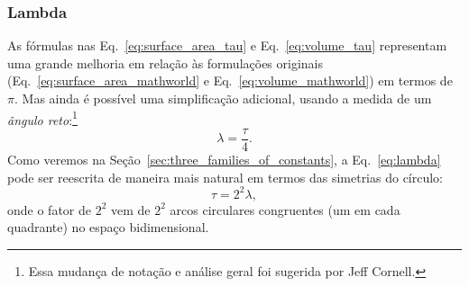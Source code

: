 {\subsubsection{Lambda} %
\label{sec:lambda}

As fórmulas nas Eq.~\eqref{eq:surface_area_tau} e Eq.~\eqref{eq:volume_tau} representam uma grande melhoria em relação às formulações originais (Eq.~\eqref{eq:surface_area_mathworld} e Eq.~\eqref{eq:volume_mathworld}) em termos de $\pi$. Mas ainda é possível uma simplificação adicional, usando a medida de um \emph{ângulo reto}:\footnote{Essa mudança de notação e análise geral foi sugerida por Jeff Cornell.}
\begin{equation}
\label{eq:lambda}
\lambda = \frac{\tau}{4}.
\end{equation}
Como veremos na Seção~\ref{sec:three_families_of_constants}, a Eq.~\eqref{eq:lambda} pode ser reescrita de maneira mais natural em termos das simetrias do círculo:
\begin{equation}
\label{eq:tau_lambda}
\tau = 2^2 \lambda,
\end{equation}
onde o fator de $2^2$ vem de $2^2$ arcos circulares congruentes (um em cada quadrante) no espaço bidimensional.

}
